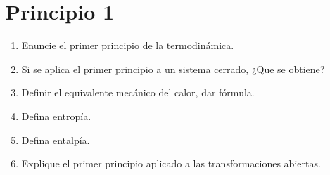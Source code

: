 \documentclass[../main]{subfiles}
\begin{document}
\chapter{Principio 1}
\begin{enumerate}
  \item Enuncie el primer principio de la termodinámica.
  \item Si se aplica el primer principio a un sistema cerrado, ¿Que se obtiene?
  \item Definir el equivalente mecánico del calor, dar fórmula.
  \item Defina entropía.
  \item Defina entalpía.
  \item Explique el primer principio aplicado a las transformaciones abiertas.
\end{enumerate}
\end{document}

